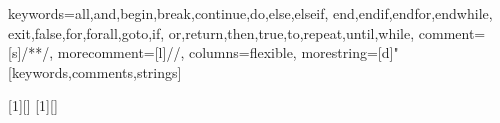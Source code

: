 \renewcommand{\normalcolor}{\color{HeadLineColor}}


\newenvironment{PauseHighLight}{
  \pausecolors{TwoColor}{TextColor}{HighLight}%
  \color{TwoColor}\pausehighlight}{}


 {keywords={all,and,begin,break,continue,do,else,elseif,%
     end,endif,endfor,endwhile,%
     exit,false,for,forall,goto,if,%
     or,return,then,true,to,repeat,until,while},%
  comment=[s]{/*}{*/},%
  morecomment=[l]//,%
  columns=flexible,%
  morestring=[d]"%
 }[keywords,comments,strings]




[1][]{}{}
[1][]{\lstset{escapechar=\$,#1}}{}

\MyLogo{}

\newcommand{\keywords}[1]{\vfill{\noindent\it #1}}

\setcounter{outlineitem}{0}
\newcommand{\outlineitem}[2]{\item%
  \def\targ{\value{emumi}}%
  \ifnum\value{enumi}=\value{outlineitem}%
  \color{HighLight}\textbf{#1}\toptarget{#2}\color{TextColor}%
   \else\toplink{#2}{#1}\fi
}
\color{TwoColor}


\newcommand{\section}[2][0]{\foilhead[#1cm]{#2}}

\newenvironment{slide}{}{\pauselevel{=1}}

